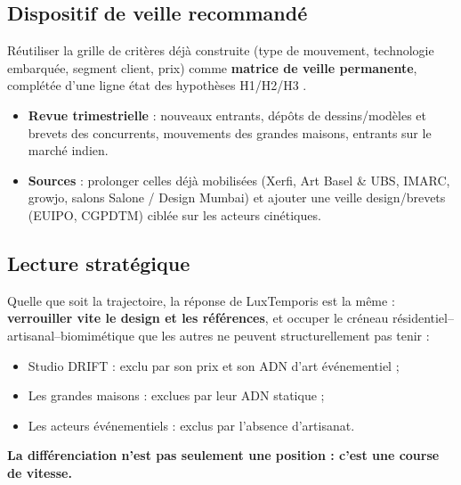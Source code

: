\documentclass[11pt,a4paper]{article}
\begin{document}
\subsection{Dispositif de veille recommandé}

Réutiliser la grille de critères déjà construite (type de mouvement, technologie embarquée, segment client, prix) comme \textbf{matrice de veille permanente}, complétée d'une ligne \og état des hypothèses H1/H2/H3 \fg{}.

\begin{itemize}
  \item \textbf{Revue trimestrielle} : nouveaux entrants, dépôts de dessins/modèles et brevets des concurrents, mouvements des grandes maisons, entrants sur le marché indien.
  \item \textbf{Sources} : prolonger celles déjà mobilisées (Xerfi, Art Basel \& UBS, IMARC, growjo, salons Salone / Design Mumbai) et ajouter une veille design/brevets (EUIPO, CGPDTM) ciblée sur les acteurs cinétiques.
\end{itemize}

\subsection{Lecture stratégique}

Quelle que soit la trajectoire, la réponse de LuxTemporis est la même : \textbf{verrouiller vite le design et les références}, et occuper le créneau \og résidentiel--artisanal--biomimétique \fg{} que les autres ne peuvent structurellement pas tenir :

\begin{itemize}
  \item Studio DRIFT : exclu par son prix et son ADN d'art événementiel ;
  \item Les grandes maisons : exclues par leur ADN statique ;
  \item Les acteurs événementiels : exclus par l'absence d'artisanat.
\end{itemize}

\begin{infobox}
\textbf{La différenciation n'est pas seulement une position : c'est une course de vitesse.}
\end{infobox}
\end{document}
